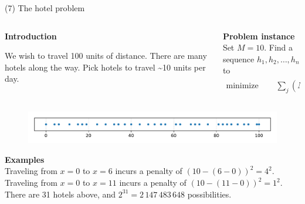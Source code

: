\documentclass[11pt, aspectratio=149]{beamer}
\theoremstyle{plain}
\begin{document}
\begin{frame}[fragile, t]{(7) The hotel problem}
	\begin{columns}
		\begin{column}{0.475\textwidth}
		\textbf{Introduction}\\ \vspace*{0.5em} 
		
		We wish to travel 100 units of distance.
		There are many hotels along the way.
		Pick hotels to travel \textasciitilde10 units per day.
		\end{column}
		\begin{column}{0.525\textwidth}%
			
	\textbf{Problem instance} \\ \vspace*{0.5em} 
	Set $M = 10$. Find a sequence $h_1, h_2, \ldots, h_n$ to 
	\begin{align*}
	\text{minimize } \quad & 
	\sum_{j} \left(M - (h_{j} - h_{j-1})  \right)^2.
	\end{align*}

		\end{column}
	\end{columns}
	
	\begin{figure}
		\centering
		\includegraphics[width=1\linewidth]{figs/hotel_problem_instance_large.pdf}
	\end{figure}
	\vspace*{-1.5em}
	\textbf{Examples} \\ \vspace*{0.5em} 
	Traveling from $x = 0$ to $x = 6$ incurs a penalty of $(10 - (6 - 0))^2 = 4^2$. \\
	Traveling from $x = 0$ to $x = 11$ incurs a penalty of $(10 - (11 - 0))^2 = 1^2$.
	There are 31 hotels above, and $2^{31} = 2\,147\,483\,648$ possibilities.
	
\end{frame}
\end{document}
